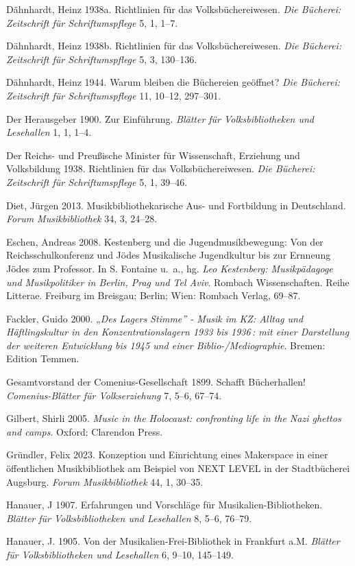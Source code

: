 \documentclass[a4paper,
fontsize=11pt,
oneside,
numbers=noperiodatend,
parskip=half-,
bibliography=totoc,
final
]{scrartcl}
\begin{document}
Dähnhardt, Heinz 1938a. Richtlinien für das Volksbüchereiwesen.
\emph{Die Bücherei: Zeitschrift für Schriftumspflege} 5, 1, 1--7.

Dähnhardt, Heinz 1938b. Richtlinien für das Volksbüchereiwesen.
\emph{Die Bücherei: Zeitschrift für Schriftumspflege} 5, 3, 130--136.

Dähnhardt, Heinz 1944. Warum bleiben die Büchereien geöffnet? \emph{Die
Bücherei: Zeitschrift für Schriftumspflege} 11, 10--12, 297--301.

Der Herausgeber 1900. Zur Einführung. \emph{Blätter für
Volksbibliotheken und Lesehallen} 1, 1, 1--4.

Der Reichs- und Preußische Minister für Wissenschaft, Erziehung und
Volksbildung 1938. Richtlinien für das Volksbüchereiwesen. \emph{Die
Bücherei: Zeitschrift für Schriftumspflege} 5, 1, 39--46.

Diet, Jürgen 2013. Musikbibliothekarische Aus- und Fortbildung in
Deutschland. \emph{Forum Musikbibliothek} 34, 3, 24--28.

Eschen, Andreas 2008. Kestenberg und die Jugendmusikbewegung: Von der
Reichsschulkonferenz und Jödes Musikalische Jugendkultur bis zur
Ernneung Jödes zum Professor. In S. Fontaine u.~a., hg. \emph{Leo
Kestenberg: Musikpädagoge und Musikpolitiker in Berlin, Prag und Tel
Aviv}. Rombach Wissenschaften. Reihe Litterae. Freiburg im Breisgau;
Berlin; Wien: Rombach Verlag, 69--87.

Fackler, Guido 2000. „\emph{Des Lagers Stimme'' - Musik im KZ: Alltag
und Häftlingskultur in den Konzentrationslagern 1933 bis 1936\,: mit
einer Darstellung der weiteren Entwicklung bis 1945 und einer
Biblio-/Mediographie}. Bremen: Edition Temmen.

Gesamtvorstand der Comenius-Gesellschaft 1899. Schafft Bücherhallen!
\emph{Comenius-Blätter für Volkserziehung} 7, 5--6, 67--74.

Gilbert, Shirli 2005. \emph{Music in the Holocaust: confronting life in
the Nazi ghettos and camps}. Oxford: Clarendon Press.

Gründler, Felix 2023. Konzeption und Einrichtung eines Makerspace in
einer öffentlichen Musikbibliothek am Beispiel von NEXT LEVEL in der
Stadtbücherei Augsburg. \emph{Forum Musikbibliothek} 44, 1, 30--35.

Hanauer, J 1907. Erfahrungen und Vorschläge für Musikalien-Bibliotheken.
\emph{Blätter für Volksbibliotheken und Lesehallen} 8, 5--6, 76--79.

Hanauer, J. 1905. Von der Musikalien-Frei-Bibliothek in Frankfurt a.M.
\emph{Blätter für Volksbibliotheken und Lesehallen} 6, 9--10, 145--149.
\end{document}
